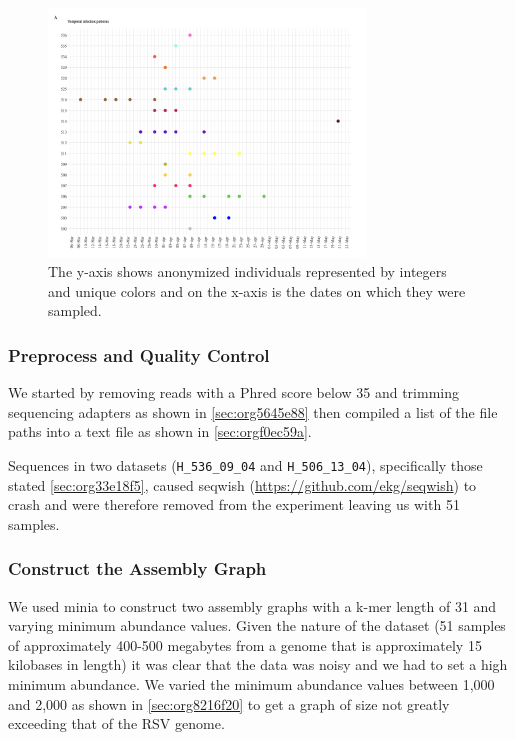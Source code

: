 \documentclass[10pt, a4paper]{article}
\begin{document}
\begin{figure}[h]
\centering
\includegraphics[width=0.75\textwidth]{../Figures/RSV/Githinji_HH_5_temporal_distribution.png}
\caption[Temporal Distribution of RSV Sample Collection]{\label{fig:org7c3db64}The y-axis shows anonymized individuals represented by integers and unique colors and on the x-axis is the dates on which they were sampled.}
\end{figure}

\subsubsection{Preprocess and Quality Control}
\label{sec:orgb8cbc78}
We started by removing reads with a Phred score below 35 and trimming sequencing
adapters as shown in \ref{sec:org5645e88} then compiled a list 
of the file paths into a text file as shown in \ref{sec:orgf0ec59a}.

Sequences in two datasets (\texttt{H\_536\_09\_04} and \texttt{H\_506\_13\_04}), specifically those 
stated \ref{sec:org33e18f5}, caused seqwish
(\url{https://github.com/ekg/seqwish}) to crash and were therefore removed from the 
experiment leaving us with 51 samples.

\subsubsection{Construct the Assembly Graph}
\label{sec:org484d116}
We used minia \cite{chikhiSpaceefficientExactBruijn2013} to construct two assembly
graphs with a k-mer length of 31 and varying minimum abundance values.
Given the nature of the dataset (51 samples of approximately 400-500 megabytes 
from a genome that is approximately 15 kilobases in length) it was clear 
that the data was noisy and we had to set a high minimum abundance. 
We varied the minimum abundance values between 1,000 and 2,000 as shown 
in \ref{sec:org8216f20} to get a graph of size not greatly exceeding that of
the RSV genome.
\end{document}
